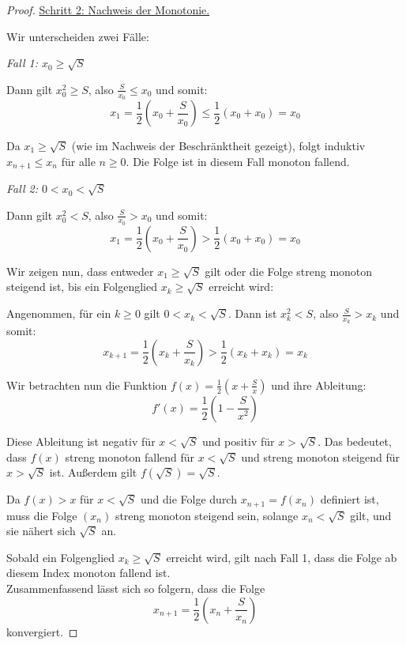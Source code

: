 \documentclass{article}
\begin{document}
\begin{proof}
    \underline{Schritt 2: Nachweis der Monotonie.}
    
    Wir unterscheiden zwei Fälle:
    
    \textit{Fall 1: $x_0 \geq \sqrt{S}$}
    
    Dann gilt $x_0^2 \geq S$, also $\frac{S}{x_0} \leq x_0$ und somit:
    $$x_1 = \frac{1}{2}\left(x_0 + \frac{S}{x_0}\right) \leq \frac{1}{2}(x_0 + x_0) = x_0$$
    
    Da $x_1 \geq \sqrt{S}$ (wie im Nachweis der Beschränktheit gezeigt), folgt induktiv $x_{n+1} \leq x_n$ für alle $n \geq 0$. Die Folge ist in diesem Fall monoton fallend.
    
    \textit{Fall 2: $0 < x_0 < \sqrt{S}$}
    
    Dann gilt $x_0^2 < S$, also $\frac{S}{x_0} > x_0$ und somit:
    $$x_1 = \frac{1}{2}\left(x_0 + \frac{S}{x_0}\right) > \frac{1}{2}(x_0 + x_0) = x_0$$
    
    Wir zeigen nun, dass entweder $x_1 \geq \sqrt{S}$ gilt oder die Folge streng monoton steigend ist, bis ein Folgenglied $x_k \geq \sqrt{S}$ erreicht wird:
    
    Angenommen, für ein $k \geq 0$ gilt $0 < x_k < \sqrt{S}$. Dann ist $x_k^2 < S$, also $\frac{S}{x_k} > x_k$ und somit:
    $$x_{k+1} = \frac{1}{2}\left(x_k + \frac{S}{x_k}\right) > \frac{1}{2}(x_k + x_k) = x_k$$
    
    Wir betrachten nun die Funktion $f(x) = \frac{1}{2}(x + \frac{S}{x})$ und ihre Ableitung:
    $$f'(x) = \frac{1}{2}\left(1 - \frac{S}{x^2}\right)$$
    
    Diese Ableitung ist negativ für $x < \sqrt{S}$ und positiv für $x > \sqrt{S}$. Das bedeutet, dass $f(x)$ streng monoton fallend für $x < \sqrt{S}$ und streng monoton steigend für $x > \sqrt{S}$ ist. Außerdem gilt $f(\sqrt{S}) = \sqrt{S}$.
    
    Da $f(x) > x$ für $x < \sqrt{S}$ und die Folge durch $x_{n+1} = f(x_n)$ definiert ist, muss die Folge $(x_n)$ streng monoton steigend sein, solange $x_n < \sqrt{S}$ gilt, und sie nähert sich $\sqrt{S}$ an.
    
    Sobald ein Folgenglied $x_k \geq \sqrt{S}$ erreicht wird, gilt nach Fall 1, dass die Folge ab diesem Index monoton fallend ist.\\
    
    Zusammenfassend lässt sich so folgern, dass die Folge
    \[x_{n+1} = \frac{1}{2}(x_n + \frac{S}{x_n})\]
    konvergiert.
    \end{proof}
\end{document}
